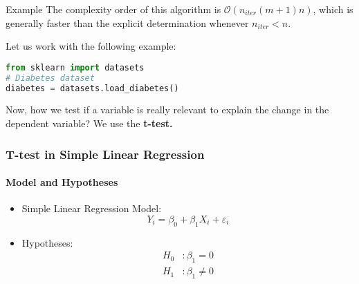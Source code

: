 \documentclass[xcolor=svgnames, t]{beamer}
\theoremstyle{definition}
\theoremstyle{plain}
\theoremstyle{remark}
\begin{document}
\begin{frame}[fragile]{Example}
The complexity order of this algorithm is $ \mathcal{O}(n_{iter}(m+1)n) $, which is generally faster than the explicit determination whenever $ n_{iter}< n. $  

Let us work with the following example:

\begin{lstlisting}[language=Python]
from sklearn import datasets
# Diabetes dataset
diabetes = datasets.load_diabetes()
\end{lstlisting}

Now, how we test if a variable is really relevant to explain the change in the dependent variable? We use the \textbf{t-test.}
\end{frame}

\begin{frame}
\frametitle{T-test in Simple Linear Regression}
\framesubtitle{Model and Hypotheses}

\begin{itemize}
    \item Simple Linear Regression Model:
    \[ Y_i = \beta_0 + \beta_1 X_i + \varepsilon_i \]
    \item Hypotheses:
    \begin{align*}
    H_0&: \beta_1 = 0 \\
    H_1&: \beta_1 \neq 0
    \end{align*}
\end{itemize}
\end{frame}
\end{document}
